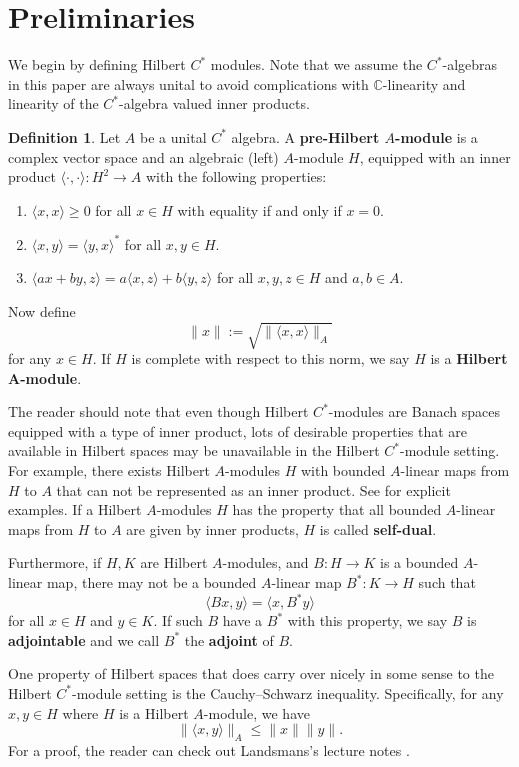 \documentclass[11pt]{amsart}
\theoremstyle{definition}
\newtheorem{defn}[thm]{Definition}
\numberwithin{equation}{section}
\begin{document}
\section{Preliminaries}
We begin by defining Hilbert $C^{*}$ modules. Note that we assume the $C^{*}$-algebras in this paper are always unital to avoid complications with $\mathbb{C}$-linearity and linearity of the $C^{*}$-algebra valued inner products.
\begin{defn}
Let $A$ be a unital $C^{*}$ algebra. A \textbf{pre-Hilbert $A$-module} is a complex vector space and an algebraic (left) $A$-module $H$, equipped with an inner product $\langle \cdot, \cdot\rangle: H^{2}\to A$ with the following properties:
\begin{enumerate}
    \item $\langle x, x\rangle \geq 0$ for all $x\in H$ with equality if and only if $x=0$.
    \item $\langle x, y\rangle =\langle y, x\rangle^{*}$ for all $x,y\in H$.
    \item $\langle ax+by,z\rangle=a\langle x,z\rangle +b\langle y, z\rangle $ for all $x,y,z\in H$ and $a,b\in A$.
\end{enumerate}
Now define $$\|x\|:=\sqrt{\| \langle x, x\rangle \|_{A}}$$ for any $x\in H$. If $H$ is complete with respect to this norm, we say $H$ is a \textbf{Hilbert A-module}.
\end{defn}

The reader should note that even though Hilbert $C^{*}$-modules are Banach spaces equipped with a type of inner product, lots of desirable properties that are available in Hilbert spaces may be unavailable in the Hilbert $C^{*}$-module setting. For example, there exists Hilbert $A$-modules $H$ with bounded $A$-linear maps from $H$ to $A$ that can not be represented as an inner product. See \cite{Frank2002Frames} for explicit examples. If a Hilbert $A$-modules $H$ has the property that all bounded $A$-linear maps from $H$ to $A$ are given by inner products, $H$ is called \textbf{self-dual}.

Furthermore, if $H,K$ are Hilbert $A$-modules, and $B: H\to K$ is a bounded $A$-linear map, there may not be a bounded $A$-linear map $B^{*}: K\to H$ such that
$$\langle Bx,y\rangle =\langle x, B^{*}y\rangle$$ for all $x\in H$ and $y\in K$. If such $B$ have a $B^{*}$ with this property, we say $B$ is \textbf{adjointable} and we call $B^{*}$ the \textbf{adjoint} of $B$.

One property of Hilbert spaces that does carry over nicely in some sense to the Hilbert $C^{*}$-module setting is the Cauchy–Schwarz inequality. Specifically, for any $x,y\in H$ where $H$ is a Hilbert $A$-module, we have
$$\|\langle x, y\rangle \|_{A}\leq \|x\| \|y\|.$$ For a proof, the reader can check out Landsmans's lecture notes \cite{Landsman1998Lecture}.
\end{document}
